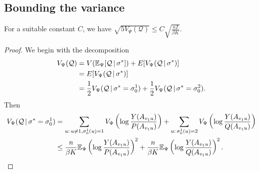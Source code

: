 \documentclass{article}
\begin{document}
\subsection{Bounding the variance}
\begin{lemma}\label{lemma: attack variance}
For a suitable constant $C$, we have $\sqrt{5 V_{\Psi} (\mathcal{Q})} \leq C \sqrt{ \frac{n I}{\beta K}}$.
\end{lemma}
\begin{proof}
We begin with the decomposition
\begin{align*}
V_{\Psi}(\mathcal{Q}) &= V( {\mathbb E}_{\Psi}[ \mathcal{Q} {\,|\,} \sigma^* ] ) + 
              E[ V_{\Psi}( \mathcal{Q} {\,|\,} \sigma^* ) ] \\
      &=   E[ V_{\Psi}( \mathcal{Q} {\,|\,} \sigma^* ) ] \\
      &=  \frac{1}{2} V_{\Psi}( \mathcal{Q} {\,|\,} \sigma^* = \sigma_0^1) + 
          \frac{1}{2} V_{\Psi}( \mathcal{Q} {\,|\,} \sigma^* = \sigma_0^2).
          \end{align*}
Then
\begin{align*}
V_{\Psi}(\mathcal{Q} {\,|\,} \sigma^* = \sigma_0^1) &= \sum_{u:\, u \neq 1, \sigma_0^1(u) = 1 } 
         V_{\Psi} \left( \log \frac{Y(A_{v_1 u})}{P(A_{v_1 u})} \right) +
                        \sum_{u :\, \sigma_0^1(u) = 2} V_{\Psi} \left( \log \frac{Y(A_{v_1 u})}{Q(A_{v_1 u})} \right)  \\
   &\leq \frac{n}{\beta K}  {\mathbb E}_{\Psi} \left( \log \frac{Y(A_{v_1 u})}{P(A_{v_1 u})} \right)^2 + 
         \frac{n}{\beta K} {\mathbb E}_{\Psi} \left( \log \frac{Y(A_{v_1 u})}{Q(A_{v_1 u})} \right)^2. 
\end{align*}


\end{proof}
\end{document}
